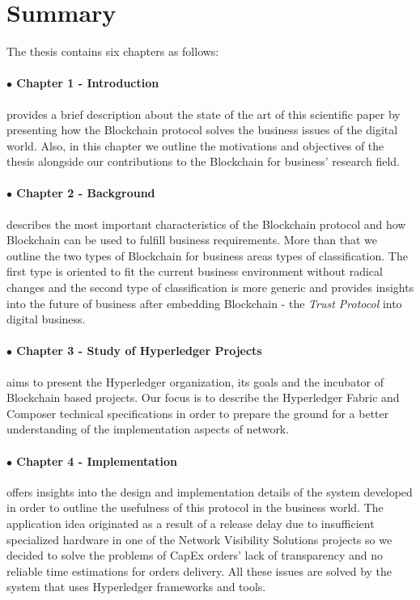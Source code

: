 \section{Summary}
\label{sec:intro-sec4}
The thesis contains six chapters as follows:

\paragraph{$\bullet$ Chapter 1 - Introduction} provides a brief description about the state of the art of this scientific paper by presenting how the Blockchain protocol solves the business issues of the digital world. Also, in this chapter we outline the motivations and objectives of the thesis alongside our contributions to the Blockchain for business' research field.

\paragraph{$\bullet$ Chapter 2 - Background} describes the most important characteristics of the Blockchain protocol and how Blockchain can be used to fulfill business requirements. More than that we outline the two types of Blockchain for business areas types of classification. The first type is oriented to fit the current business environment without radical changes and the second type of classification is more generic and provides insights into the future of business after embedding Blockchain - the \emph{Trust Protocol} into digital business.

\paragraph{$\bullet$ Chapter 3 - Study of Hyperledger Projects} aims to present the Hyperledger organization, its goals and the incubator of Blockchain based projects. Our focus is to describe the Hyperledger Fabric and Composer technical specifications in order to prepare the ground for a better understanding of  the implementation aspects of {\project} network.  

\paragraph{$\bullet$ Chapter 4 - Implementation} offers insights into the design and implementation details of the {\project} system developed in order to outline the usefulness of this protocol in the business world. The application idea originated as a result of a release delay due to insufficient specialized hardware in one of the Network Visibility Solutions projects so we decided to solve the problems of CapEx orders' lack of transparency and no reliable time estimations for orders delivery. All these issues are solved by the {\project} system that uses Hyperledger frameworks and tools.

